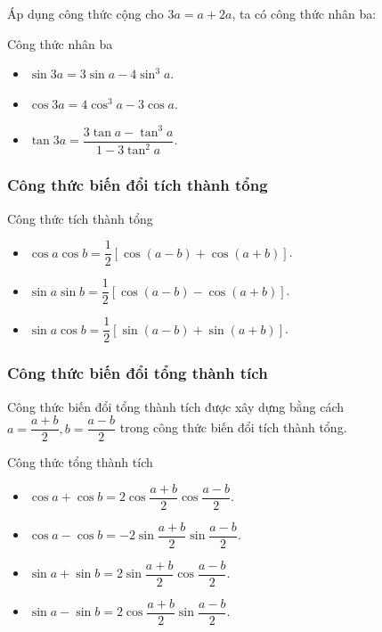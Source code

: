 \begin{note}
	Áp dụng công thức cộng cho $3a = a +2a$, ta có công thức nhân ba:
\end{note}
\begin{khung4}{Công thức nhân ba}
	\begin{multicols}{2}
	\begin{itemize}
		\item $\sin3a= 3\sin a -4\sin^3a$.		
		\item $\cos3a= 4\cos^3a-3\cos a$.
		\item $\tan3a = \dfrac{3\tan a - \tan^3 a}{1-3\tan^2a}$.
	\end{itemize}
\end{multicols}
\end{khung4}

\subsubsection{Công thức biến đổi tích thành tổng}
\begin{khung4}{Công thức tích thành tổng}
	\begin{multicols}{2}
	\begin{itemize}
		\item $\cos a \cos b = \dfrac{1}{2}\left[\cos (a-b) + \cos (a+b)\right]$.
		\item $\sin a \sin b = \dfrac{1}{2}\left[\cos (a-b)-\cos(a+b)\right]$.
		\item $\sin a \cos b = \dfrac{1}{2}\left[\sin (a-b)+\sin (a+b)\right]$.
	\end{itemize}
	\end{multicols}
\end{khung4}
\subsubsection{Công thức biến đổi tổng thành tích}
Công thức biến đổi tổng thành tích được xây dựng bằng cách $a=\dfrac{a+b}{2}, b = \dfrac{a-b}{2}$ trong công thức biến đổi tích thành tổng.
\begin{khung4}{Công thức tổng thành tích}
	\begin{multicols}{2}
	\begin{itemize}
		\item $\cos a+ \cos b = 2\cos\dfrac{a+b}{2}\cos \dfrac{a-b}{2}$.
		\item $\cos a- \cos b = -2\sin\dfrac{a+b}{2}\sin \dfrac{a-b}{2}$.
		\item $\sin a+ \sin b = 2\sin\dfrac{a+b}{2}\cos \dfrac{a-b}{2}$.
		\item $\sin a -\sin b = 2\cos\dfrac{a+b}{2}\sin \dfrac{a-b}{2}$.
	\end{itemize}
\end{multicols}
\end{khung4}
\newpage

